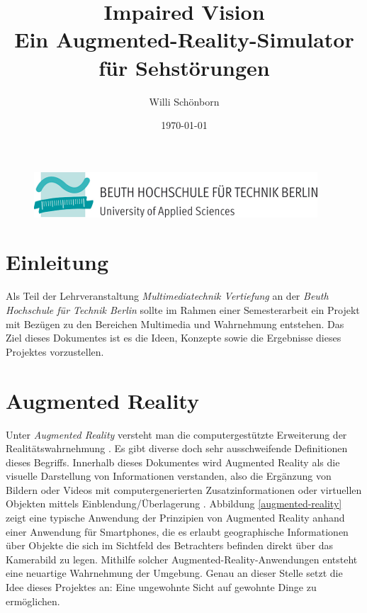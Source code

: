 \documentclass[a4paper]{article}
\title{Impaired Vision \\ Ein Augmented-Reality-Simulator für Sehstörungen}
\author{Willi Schönborn}
\date{\today}
\begin{document}
\begin{figure}[H]
\centering
\includegraphics{beuth.png}
\maketitle
\end{figure}

\section*{Einleitung}
Als Teil der Lehrveranstaltung \textit{Multimediatechnik Vertiefung} an der \textit{Beuth Hochschule für Technik Berlin} sollte im Rahmen einer Semesterarbeit ein Projekt mit Bezügen zu den Bereichen Multimedia und Wahrnehmung entstehen. Das Ziel dieses Dokumentes ist es die Ideen, Konzepte sowie die Ergebnisse dieses Projektes vorzustellen.

\section*{Augmented Reality}
Unter \textit{Augmented Reality} versteht man die computergestützte Erweiterung der Realitätswahrnehmung \cite{WP-AR}. Es gibt diverse doch sehr ausschweifende Definitionen dieses Begriffs. Innerhalb dieses Dokumentes wird Augmented Reality als die visuelle Darstellung von Informationen verstanden, also die Ergänzung von Bildern oder Videos mit computergenerierten Zusatzinformationen oder virtuellen Objekten mittels Einblendung/Überlagerung \cite{WP-AR}. Abbildung \ref{augmented-reality} zeigt eine typische Anwendung der Prinzipien von Augmented Reality anhand einer Anwendung für Smartphones, die es erlaubt geographische Informationen über Objekte die sich im Sichtfeld des Betrachters befinden direkt über das Kamerabild zu legen. Mithilfe solcher Augmented-Reality-Anwendungen entsteht eine neuartige Wahrnehmung der Umgebung. Genau an dieser Stelle setzt die Idee dieses Projektes an: Eine ungewohnte Sicht auf gewohnte Dinge zu ermöglichen.
\end{document}
